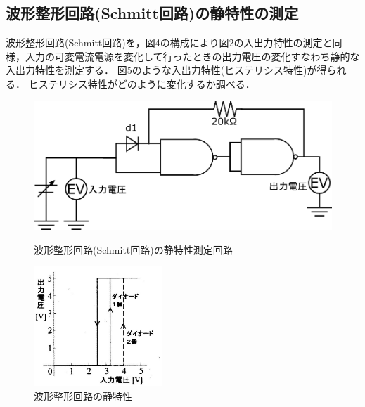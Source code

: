 \documentclass[10pt, a4j, dvipdfmx]{jarticle}
\begin{document}
\subsection{波形整形回路(Schmitt回路)の静特性の測定}
波形整形回路(Schmitt回路)を，図4の構成により図2の入出力特性の測定と同様，入力の可変電流電源を変化して行ったときの出力電圧の変化すなわち静的な入出力特性を測定する．
図5のような入出力特性(ヒステリシス特性)が得られる．
ヒステリシス特性がどのように変化するか調べる．
\begin{figure}[H]
  \begin{minipage}{0.5\hsize}
    \centering
   	\includegraphics[width=0.9\hsize]{images/text/fig4.png}
    \caption{波形整形回路(Schmitt回路)の静特性測定回路}
  \end{minipage}
  \begin{minipage}{0.5\hsize}
    \centering
	\includegraphics[height=45mm]{images/text/fig5.png}
    \caption{波形整形回路の静特性}
  \end{minipage}
\end{figure}

\newpage
\end{document}
